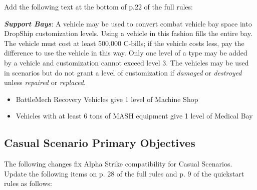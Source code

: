 Add the following text at the bottom of p.22 of the full rules:

\emph{\bfseries Support Bays}: A vehicle may be used to convert combat vehicle bay space into DropShip customization levels.
Using a vehicle in this fashion fills the entire bay.
The vehicle must cost at least 500,000 C-bills; if the vehicle costs less, pay the difference to use the vehicle in this way.
Only one level of a type may be added by a vehicle and customization cannot exceed level 3.
The vehicles may be used in scenarios but do not grant a level of customization if \emph{damaged} or \emph{destroyed} unless \emph{repaired} or \emph{replaced}.

\begin{itemize}

\item BattleMech Recovery Vehicles give 1 level of Machine Shop

\item Vehicles with at least 6 tons of MASH equipment give 1 level of Medical Bay

\end{itemize}

\subsection{Casual Scenario Primary Objectives}

The following changes fix Alpha Strike compatibility for Casual Scenarios.
Update the following items on p. 28 of the full rules and p. 9 of the quickstart rules  as follows:

